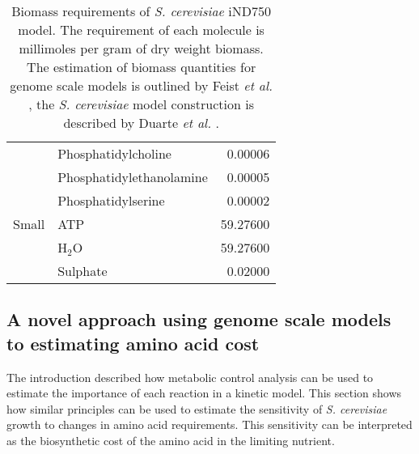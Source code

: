 \begin{table}
\begin{footnotesize}
\begin{tabular}{l l r}
                   & Phosphatidylcholine            &  0.00006                             \\
                   & Phosphatidylethanolamine       &  0.00005                             \\
                   & Phosphatidylserine             &  0.00002                             \\ \midrule
      Small        & ATP                            & 59.27600                             \\
                   & H$_2$O                         & 59.27600                             \\
                   & Sulphate                       &  0.02000                             \\ \bottomrule
  \end{tabular}
  \end{footnotesize}
  \caption[Biomass requirements \emph{S. cerevisiae} iND750 model]{Biomass requirements of \emph{S. cerevisiae} iND750 model. The requirement of each molecule is millimoles per gram of dry weight biomass. The estimation of biomass quantities for genome scale models is outlined by Feist \emph{et al.} \cite{feist2009}, the \emph{S. cerevisiae} model construction is described by Duarte \emph{et al.} \cite{duarte2004a}.}
  \label{table:biomass_requirements}
\end{table}%

\subsection{A novel approach using genome scale models to estimating amino acid cost}\label{section:amino_acid_cost_estimation}%

The introduction described how metabolic control analysis can be used to estimate the importance of each reaction in a kinetic model. This section shows how similar principles can be used to estimate the sensitivity of \emph{S. cerevisiae} growth to changes in amino acid requirements. This sensitivity can be interpreted as the biosynthetic cost of the amino acid in the limiting nutrient.


